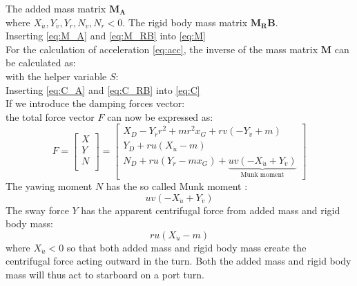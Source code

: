 The added mass matrix $\mathbf{M_A}$
\begin{equation}
    \label{eq:M_A}
    
\end{equation}
where $X_{\dot{u}},Y_{\dot{v}},Y_{\dot{r}},N_{\dot{v}},N_{\dot{r}} < 0$. 
The rigid body mass matrix $\mathbf{M_RB}$.
\begin{equation}
    \label{eq:M_RB}
    
\end{equation}
Inserting \autoref{eq:M_A} and \autoref{eq:M_RB} into \autoref{eq:M}
\begin{equation}
    \label{eq:M_expanded}
    
\end{equation}
For the calculation of acceleration \autoref{eq:acc}, the inverse of the mass matrix $\mathbf{M}$ can be calculated as:
\begin{equation}
    \label{eq:M_inv}
    
\end{equation}
with the helper variable $S$:
\begin{equation}
    \label{eq:S}
    
\end{equation}
Inserting \autoref{eq:C_A} and \autoref{eq:C_RB} into \autoref{eq:C}
\begin{equation}
    \label{eq:C_expanded}
    
\end{equation}
If we introduce the damping forces vector:
\begin{equation}
    \label{eq:D}
    
\end{equation}
the total force vector $F$ can now be expressed as:
\begin{equation}
    \label{eq:F_expanded}
F = 
\left[\begin{matrix}
X \\
Y \\
N \\
\end{matrix}\right]
=
\left[\begin{matrix}X_{D} - Y_{\dot{r}} r^{2} + m r^{2} x_{G} + r v \left(- Y_{\dot{v}} + m\right)\\Y_{D} + r u \left(X_{\dot{u}} - m\right)\\N_{D} + r u \left(Y_{\dot{r}} - m x_{G}\right) + \underbrace{u v \left(- X_{\dot{u}} + Y_{\dot{v}}\right)}_{\text{Munk moment}} \end{matrix}\right]
\end{equation}
The yawing moment $N$ has the so called Munk moment \citep{fossen_handbook_2021}:
$$
u v \left(- X_{\dot{u}} + Y_{\dot{v}}\right)
$$
The sway force $Y$ has the apparent centrifugal force from added mass and rigid body mass: 
$$r u \left(X_{\dot{u}} - m\right)$$ where $X_{\dot{u}}<0$ so that both added mass and rigid body mass create the centrifugal force acting outward in the turn. Both the added mass and rigid body mass will thus act to starboard on a port turn.

